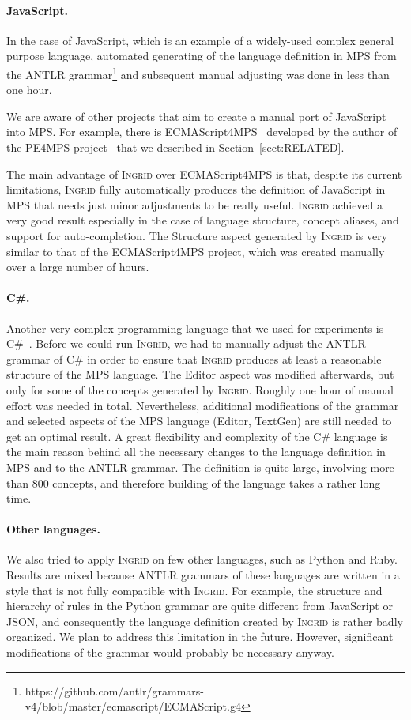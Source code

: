 \paragraph{JavaScript.}
In the case of JavaScript, which is an example of a widely-used complex general purpose language, automated generating of the language definition in MPS from the ANTLR grammar\footnote{https://github.com/antlr/grammars-v4/blob/master/ecmascript/ECMAScript.g4} and subsequent manual adjusting was done in less than one hour.

We are aware of other projects that aim to create a manual port of JavaScript into MPS.
For example, there is ECMAScript4MPS~\cite{ref:ECMA4MPS} developed by the author of the PE4MPS project~\cite{ref:PE4MPS} that we described in Section~\ref{sect:RELATED}.

The main advantage of \textsc{Ingrid} over ECMAScript4MPS is that, despite its current limitations, \textsc{Ingrid} fully automatically produces the definition of JavaScript in MPS that needs just minor adjustments to be really useful.
\textsc{Ingrid} achieved a very good result especially in the case of language structure, concept aliases, and support for auto-completion.
The Structure aspect generated by \textsc{Ingrid} is very similar to that of the ECMAScript4MPS project, which was created manually over a large number of hours.

\paragraph{C\#.}
Another very complex programming language that we used for experiments is C\#~\cite{ref:CSHARP}.
Before we could run \textsc{Ingrid}, we had to manually adjust the ANTLR grammar of C\# in order to ensure that \textsc{Ingrid} produces at least a reasonable structure of the MPS language.
The Editor aspect was modified afterwards, but only for some of the concepts generated by \textsc{Ingrid}. 
Roughly one hour of manual effort was needed in total.
Nevertheless, additional modifications of the grammar and selected aspects of the MPS language (Editor, TextGen) are still needed to get an optimal result.
A great flexibility and complexity of the C\# language is the main reason behind all the necessary changes to the language definition in MPS and to the ANTLR grammar.
The definition is quite large, involving more than 800 concepts, and therefore building of the language takes a rather long time.

\paragraph{Other languages.}
We also tried to apply \textsc{Ingrid} on few other languages, such as Python and Ruby.
Results are mixed because ANTLR grammars of these languages are written in a style that is not fully compatible with \textsc{Ingrid}.
For example, the structure and hierarchy of rules in the Python grammar are quite different from JavaScript or JSON, and consequently the language definition created by \textsc{Ingrid} is rather badly organized.
We plan to address this limitation in the future.
However, significant modifications of the grammar would probably be necessary anyway.

